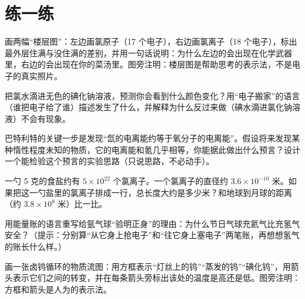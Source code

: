 \section*{练一练}

\begin{sikaoti}
\item 画两幅“楼层图”：左边画氯原子（17 个电子），右边画氯离子（18 个电子），标出最外层住满与没住满的差别，并用一句话说明：为什么左边的会出现在化学武器里，右边的会出现在你的菜汤里。图旁注明：楼层图是帮助思考的表示法，不是电子的真实照片。
\item 把氯水滴进无色的碘化钠溶液，预测你会看到什么颜色变化？用“电子搬家”的语言（谁把电子给了谁）描述发生了什么，并解释为什么反过来做（碘水滴进氯化钠溶液）不会有现象。
\item 巴特利特的关键一步是发现“氙的电离能约等于氧分子的电离能”。假设将来发现某种惰性程度未知的物质，它的电离能和氪几乎相等，你能据此做出什么预言？设计一个能检验这个预言的实验思路（只说思路，不必动手）。
\item 一勺 5 克的食盐约有 $5\times 10^{22}$ 个氯离子。一个氯离子的直径约 $3.6\times 10^{-10}$ 米。如果把这一勺盐里的氯离子排成一行，总长度大约是多少米？和地球到月球的距离（约 $3.8\times 10^{8}$ 米）比一比。
\item 用能量账的语言重写给氩气球“验明正身”的理由：为什么节日气球充氦气比充氢气安全？（提示：分别算“从它身上抢电子”和“往它身上塞电子”两笔账，再想想氢气的账长什么样。）
\item 画一张卤钨循环的物质流图：用方框表示“灯丝上的钨”“蒸发的钨”“碘化钨”，用箭头表示它们之间的转变，并在每条箭头旁标出该处的温度是高还是低。图旁注明：方框和箭头是人为的表示法。
\end{sikaoti}
